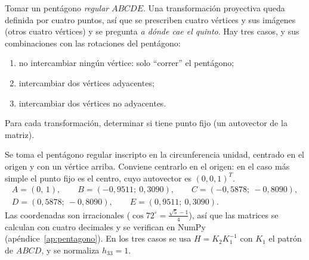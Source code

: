 \begin{enunciado}
Tomar un pentágono \emph{regular} \(ABCDE\). Una transformación proyectiva queda definida
por cuatro puntos, así que se prescriben cuatro vértices y sus imágenes (otros cuatro
vértices) y se pregunta \emph{a dónde cae el quinto}. Hay tres casos, y sus combinaciones
con las rotaciones del pentágono:
\begin{enumerate}[label=(\alph*)]
  \item no intercambiar ningún vértice: solo \enquote{correr} el pentágono;
  \item intercambiar dos vértices adyacentes;
  \item intercambiar dos vértices no adyacentes.
\end{enumerate}
Para cada transformación, determinar si tiene punto fijo (un autovector de la matriz).
\end{enunciado}

Se toma el pentágono regular inscripto en la circunferencia unidad,
centrado en el origen y con un vértice arriba. Conviene centrarlo en el origen:
en el caso más simple el punto fijo es el centro, cuyo autovector es \((0,0,1)^T\).
\begin{gather*}
  A=(0,\,1),\qquad B=(-0{,}9511;\ 0{,}3090),\qquad C=(-0{,}5878;\ -0{,}8090),\\
  D=(0{,}5878;\ -0{,}8090),\qquad E=(0{,}9511;\ 0{,}3090).
\end{gather*}
Las coordenadas son irracionales (\(\cos72^\circ=\frac{\sqrt5-1}{4}\)), así que las
matrices se calculan con cuatro decimales y se verifican en NumPy (apéndice~\ref{ap:pentagono}).
En los tres casos se usa \(H=K_2K_1^{-1}\) con \(K_1\) el patrón de \(ABCD\), y se
normaliza \(h_{33}=1\).

